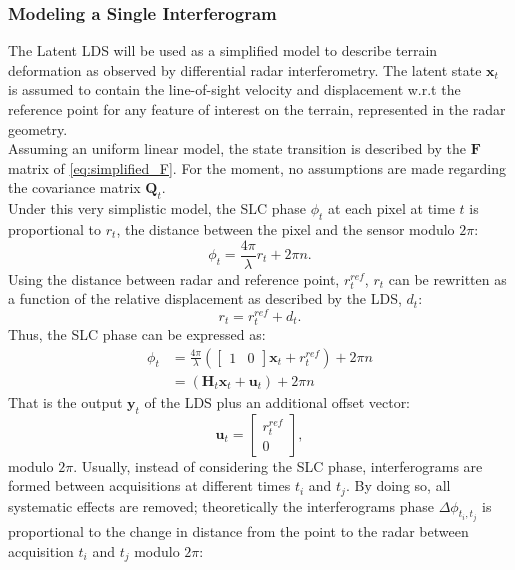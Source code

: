 \documentclass{article}
\begin{document}
\subsubsection{Modeling a Single Interferogram}
The Latent LDS will be used as a simplified model to describe terrain deformation as observed by differential radar interferometry. The latent state $\mathbf{x}_t$ is assumed to contain the line-of-sight velocity and displacement w.r.t  the reference point for any feature of interest on the terrain, represented in the radar geometry.\\ Assuming an uniform linear model, the state transition is described by the $\mathbf{F}$ matrix of \autoref{eq:simplified_F}. For the moment, no assumptions are made regarding the covariance matrix $\mathbf{Q}_t$.\\
Under this very simplistic model, the SLC phase $\phi_t$ at each pixel at time $t$ is proportional to $r_t$, the distance between the pixel and the sensor modulo $2 \pi$:
\begin{equation}
	\phi_t = \frac{4\pi}{\lambda} r_t + 2 \pi n.
\end{equation}
Using the distance between radar and reference point, $r_t^{ref}$, $r_t$ can be rewritten as a function of the relative displacement as described by the LDS, $d_t$:
\begin{equation}
	r_t = r_t^{ref} + d_t.
\end{equation}
Thus, the SLC phase can be expressed as:
\begin{equation}
	\begin{aligned}
	\phi_t  &= \frac{4\pi}{\lambda} \left(
		\begin{bmatrix}
			1 & 0
		\end{bmatrix} \mathbf{x}_{t}
		+  r_t^{ref}
		\right) + 2 \pi n\\
		 &= \left(\mathbf{H}_{t}\mathbf{x}_t + \mathbf{u}_t\right) + 2 \pi n
	\end{aligned}		
\end{equation}
That is the output $\mathbf{y}_t $ of the LDS plus an additional offset vector:
\begin{equation}
	\mathbf{u}_t = 
	\begin{bmatrix}
		r_{t}^{ref}\\
		0
	\end{bmatrix},
\end{equation}	 modulo $2\pi$.
Usually, instead of considering the SLC phase, interferograms are formed between acquisitions at different times $t_i$ and $t_j$. By doing so, all systematic effects are removed; theoretically the interferograms phase $\Delta\phi_{t_i,t_j}$ is proportional to the change in distance from the point to the radar between acquisition $t_i$ and $t_j$ modulo $2\pi$:
\end{document}
